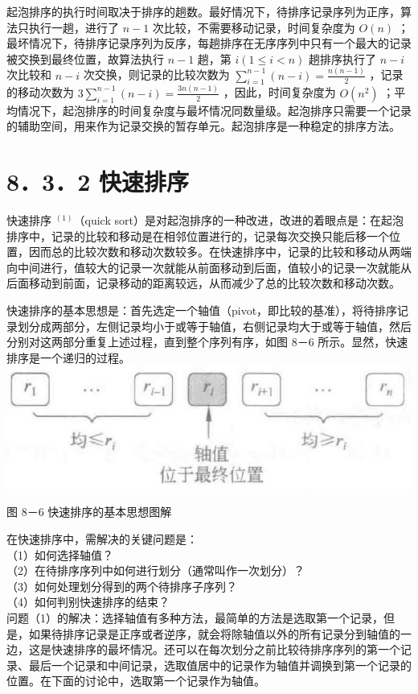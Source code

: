 \documentclass[10pt]{article}
\begin{document}
起泡排序的执行时间取决于排序的趟数。最好情况下，待排序记录序列为正序，算法只执行一趟，进行了 $n-1$ 次比较，不需要移动记录，时间复杂度为 $O(n)$ ；最坏情况下，待排序记录序列为反序，每趟排序在无序序列中只有一个最大的记录被交换到最终位置，故算法执行 $n-1$ 趟，第 $i(1 \leqslant i<n)$ 趟排序执行了 $n-i$ 次比较和 $n-i$ 次交换，则记录的比较次数为 $\sum_{i=1}^{n-1}(n-i)=\frac{n(n-1)}{2}$ ，记录的移动次数为 $3 \sum_{i=1}^{n-1}(n-i)=\frac{3 n(n-1)}{2}$ ，因此，时间复杂度为 $O\left(n^{2}\right)$ ；平均情况下，起泡排序的时间复杂度与最坏情况同数量级。起泡排序只需要一个记录的辅助空间，用来作为记录交换的暂存单元。起泡排序是一种稳定的排序方法。

\section*{8．3．2 快速排序}
快速排序 ${ }^{(1)}$（quick sort）是对起泡排序的一种改进，改进的着眼点是：在起泡排序中，记录的比较和移动是在相邻位置进行的，记录每次交换只能后移一个位置，因而总的比较次数和移动次数较多。在快速排序中，记录的比较和移动从两端向中间进行，值较大的记录一次就能从前面移动到后面，值较小的记录一次就能从后面移动到前面，记录移动的距离较远，从而减少了总的比较次数和移动次数。

快速排序的基本思想是：首先选定一个轴值（pivot，即比较的基准），将待排序记录划分成两部分，左侧记录均小于或等于轴值，右侧记录均大于或等于轴值，然后分别对这两部分重复上述过程，直到整个序列有序，如图 8－6 所示。显然，快速排序是一个递归的过程。\\
\includegraphics[max width=\textwidth, center]{2025_06_06_704745ea57b15b2333e5g-277}

图 8－6 快速排序的基本思想图解

在快速排序中，需解决的关键问题是：\\
（1）如何选择轴值？\\
（2）在待排序序列中如何进行划分（通常叫作一次划分）？\\
（3）如何处理划分得到的两个待排序子序列？\\
（4）如何判别快速排序的结束？\\
问题（1）的解决：选择轴值有多种方法，最简单的方法是选取第一个记录，但是，如果待排序记录是正序或者逆序，就会将除轴值以外的所有记录分到轴值的一边，这是快速排序的最坏情况。还可以在每次划分之前比较待排序序列的第一个记录、最后一个记录和中间记录，选取值居中的记录作为轴值并调换到第一个记录的位置。在下面的讨论中，选取第一个记录作为轴值。
\end{document}
